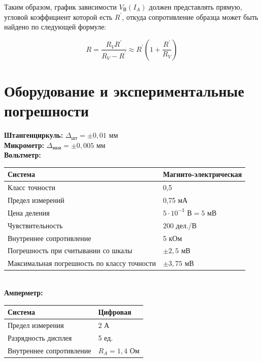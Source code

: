 \documentclass[a4paper,12pt]{article} %
\begin{document}
Таким образом, график зависимости $V_\text{В}\left(I_A\right)$ должен представлять прямую, угловой коэффициент которой есть $R^\prime$, откуда сопротивление образца может быть найдено по следующей формуле:

\begin{equation}\label{r_provoloki}
R = \dfrac{R_V R^\prime}{R_V - R^\prime} \approx R^\prime \left( 1 + \frac{R^\prime}{R_V} \right) 
\end{equation}

\section{Оборудование и экспериментальные погрешности}

\textbf{Штангенциркуль:} $\Delta_\text{шт} = \pm 0,01$ мм \\
\textbf{Микрометр:} $\Delta_\text{мкм} = \pm 0,005$ мм \\
\textbf{Вольтметр:} 

\begin{tabular}[]{|l|l|}
\hline
Система & Магнито-электрическая \\
\hline
Класс точности & 0,5 \\
\hline
Предел измерений & 0,75 мА  \\
\hline
Цена деления & $5 \cdot 10^{-3} \text{ В} = 5 \text{ мВ}$  \\
\hline
Чувствительность& 200 дел./В \\
\hline
Внутреннее сопротивление& 5 кОм  \\
\hline
Погрешность при считывании со шкалы& $\pm2,5\text{ мВ}$  \\
\hline
Максимальная погрешность по классу точности& $\pm3,75\text{ мВ}$ \\
\hline
\end{tabular}\\

\noindent \textbf{Амперметр:}

\begin{tabular}{|l|l|}
	\hline
	Система&Цифровая \\
	\hline
	Предел измерения&2 А \\
	\hline
	Разрядность дисплея& 5 ед. \\
	\hline
	Внутреннее сопротивление& $R_A = 1,4 \text{ Ом}$ \\
	\hline
\end{tabular}\\

\medskip
\end{document}
